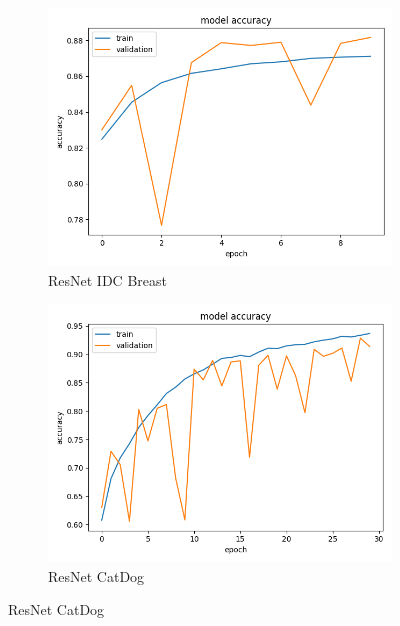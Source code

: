\begin{figure}
\begin{subfigure}[b]{.45\linewidth}
\includegraphics[width=\linewidth]{Figs/resnet_breast_acc.jpg}
\caption{ResNet IDC Breast}
\end{subfigure}
\begin{subfigure}[b]{.45\linewidth}
\includegraphics[width=\linewidth]{Figs/resnet_catdog_acc.jpg}
\caption{ResNet CatDog}
\end{subfigure}


\end{figure}
